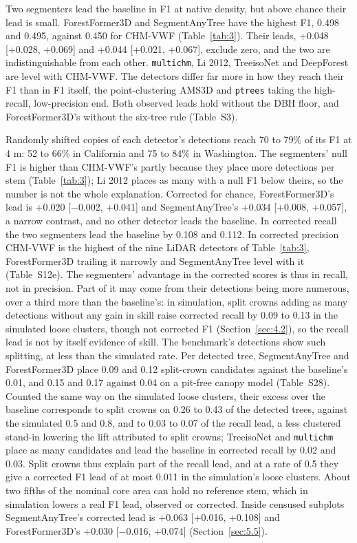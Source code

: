 \documentclass[preprint,12pt,authoryear,a4paper]{elsarticle}
\begin{document}
Two segmenters lead the baseline in F1 at native density, but above chance their
lead is small. ForestFormer3D and SegmentAnyTree have the highest F1, 0.498 and
0.495, against 0.450 for CHM-VWF (Table~\ref{tab:3}). Their leads, +0.048 [+0.028, +0.069]
and +0.044 [+0.021, +0.067], exclude zero, and the two are indistinguishable
from each other. \texttt{multichm}, Li 2012, TreeisoNet and DeepForest are level with
CHM-VWF. The detectors differ far more in how they reach their F1 than in F1
itself, the point-clustering AMS3D and \texttt{ptrees} taking the high-recall,
low-precision end. Both observed leads hold without the DBH floor, and
ForestFormer3D's without the six-tree rule (Table~S3).

Randomly shifted copies of each detector's detections reach 70 to 79\% of its F1
at 4 m: 52 to 66\% in California and 75 to 84\% in Washington. The segmenters'
null F1 is higher than CHM-VWF's partly because they place more detections per
stem (Table~\ref{tab:3}); Li 2012 places as many with a null F1 below theirs, so the
number is not the whole explanation. Corrected for chance, ForestFormer3D's lead
is +0.020 [$-$0.002, +0.041] and SegmentAnyTree's +0.034 [+0.008, +0.057], a
narrow contrast, and no other detector leads the baseline. In corrected recall
the two segmenters lead the baseline by 0.108 and 0.112. In corrected precision
CHM-VWF is the highest of the nine LiDAR detectors of Table~\ref{tab:3}, ForestFormer3D
trailing it narrowly and SegmentAnyTree level with it (Table~S12e). The
segmenters' advantage in the corrected scores is thus in recall, not in
precision. Part of it may come from their detections being more numerous, over a
third more than the baseline's: in simulation, split crowns adding as many
detections without any gain in skill raise corrected recall by 0.09 to 0.13 in
the simulated loose clusters, though not corrected F1 (Section~\ref{sec:4.2}), so the
recall lead is not by itself evidence of skill. The benchmark's detections
show such splitting, at less than the simulated rate. Per detected tree,
SegmentAnyTree and ForestFormer3D place 0.09 and 0.12 split-crown candidates
against the baseline's 0.01, and 0.15 and 0.17 against 0.04 on a pit-free canopy
model (Table~S28). Counted the same way on the simulated loose clusters, their
excess over the baseline corresponds to split crowns on 0.26 to 0.43 of the
detected trees, against the simulated 0.5 and 0.8, and to 0.03 to 0.07 of the
recall lead, a less clustered stand-in lowering the lift attributed to split
crowns; TreeisoNet and \texttt{multichm} place as many candidates and lead the
baseline in corrected recall by 0.02 and 0.03. Split crowns thus explain part
of the recall lead, and at a rate of 0.5 they give a corrected F1 lead of at
most 0.011 in the simulation's loose clusters. About two fifths of the nominal
core area can hold no reference stem, which in simulation lowers a real F1
lead, observed or corrected. Inside censused subplots SegmentAnyTree's
corrected lead is +0.063 [+0.016, +0.108] and ForestFormer3D's +0.030 [$-$0.016,
+0.074] (Section~\ref{sec:5.5}).
\end{document}
